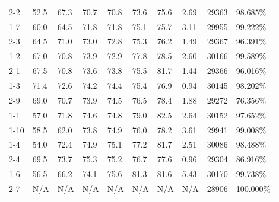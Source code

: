 \begin{table}[]
\begin{tabular}{@{}llllllllll@{}}
2-2  & 52.5 & 67.3 & 70.7 & 70.8 & 73.6 & 75.6 & 2.69 & \num{29363} & 98.685\%         \\
1-7  & 60.0 & 64.5 & 71.8 & 71.8 & 75.1 & 75.7 & 3.11 & \num{29955} & 99.222\%         \\
2-3  & 64.5 & 71.0 & 73.0 & 72.8 & 75.3 & 76.2 & 1.49 & \num{29367} & 96.391\%         \\
1-2  & 67.0 & 70.8 & 73.9 & 72.9 & 77.8 & 78.5 & 2.60 & \num{30166} & 99.589\%         \\
2-1  & 67.5 & 70.8 & 73.6 & 73.8 & 75.5 & 81.7 & 1.44 & \num{29366} & 96.016\%         \\
1-3  & 71.4 & 72.6 & 74.2 & 74.4 & 75.4 & 76.9 & 0.94 & \num{30145} & 98.202\%         \\
2-9  & 69.0 & 70.7 & 73.9 & 74.5 & 76.5 & 78.4 & 1.88 & \num{29272} & 76.356\%         \\
1-1  & 57.0 & 71.8 & 74.6 & 74.8 & 79.0 & 82.5 & 2.64 & \num{30152} & 97.652\%         \\
1-10 & 58.5 & 62.0 & 73.8 & 74.9 & 76.0 & 78.2 & 3.61 & \num{29941} & 99.008\%         \\
1-4  & 54.0 & 72.4 & 74.9 & 75.1 & 77.2 & 81.7 & 2.51 & \num{30086} & 98.488\%         \\
2-4  & 69.5 & 73.7 & 75.3 & 75.2 & 76.7 & 77.6 & 0.96 & \num{29304} & 86.916\%         \\
1-6  & 56.5 & 66.2 & 74.1 & 75.6 & 81.3 & 81.6 & 5.43 & \num{30170} & 99.738\%         \\
2-7  & N/A  & N/A  & N/A  & N/A  & N/A  & N/A  & N/A  & \num{28906} & 100.000\%        \\ \bottomrule
\end{tabular}
\end{table}




